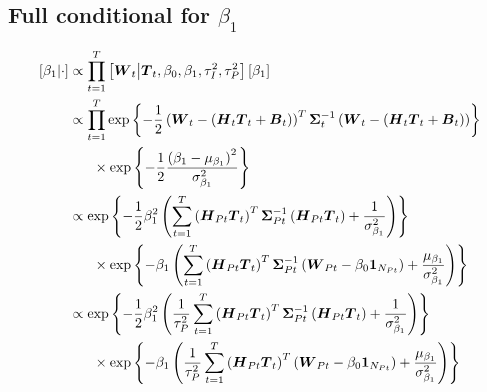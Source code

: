 \documentclass{article}\usepackage[]{graphicx}\usepackage[]{color}
\def\bm#1{\mbox{\boldmath $#1$}}
\begin{document}
\subsection{Full conditional for $\beta_1$}
%
\begin{align*}
%
\left[ \beta_1 \middle| \cdot \right] & \propto \prod_{t = 1}^T \left[ \bm{W}_t \middle| \bm{T}_t, \beta_0, \beta_1, \tau^2_I, \tau^2_P \right] \left[ \beta_1 \right]\\
%
& \propto \prod_{t = 1}^T \exp{ \left\{ - \frac{1} {2} \left( \bm{W}_t - \left( \bm{H}_t \bm{T}_t + \bm{B}_t \right) \right)^T \bm{\Sigma}_t^{ - 1} \left( \bm{W}_t - \left( \bm{H}_t \bm{T}_t + \bm{B}_t \right) \right) \right\} }\\
& \hspace{6mm} \times \exp{ \left\{ - \frac{1} {2} \frac{\left( \beta_1 - \mu_{\beta_1} \right)^2} {\sigma^2_{\beta_1}} \right\} }\\
%
& \propto \exp{ \left\{ - \frac{1} {2} \beta_1^2 \left( \sum_{t = 1}^T \left( \bm{H}_{Pt} \bm{T}_t \right)^T \bm{\Sigma}_{Pt}^{ - 1} \left( \bm{H}_{Pt} \bm{T}_t \right) + \frac{1} {\sigma^2_{\beta_1}} \right) \right\} }\\
& \hspace{6mm} \times \exp{ \left\{ - \beta_1 \left( \sum_{t = 1}^T \left( \bm{H}_{Pt} \bm{T}_t \right)^T \bm{\Sigma}_{Pt}^{ - 1} \left( \bm{W}_{Pt} - \beta_0 \bm{1}_{N_{Pt}} \right) + \frac{\mu_{\beta_1}} {\sigma^2_{\beta_1}} \right) \right\} }\\
%
& \propto \exp{ \left\{ - \frac{1} {2} \beta_1^2 \left( \frac{1} {\tau^2_P} \sum_{t = 1}^T \left( \bm{H}_{Pt} \bm{T}_t \right)^T \bm{\Sigma}_{Pt}^{ - 1} \left( \bm{H}_{Pt} \bm{T}_t \right) + \frac{1} {\sigma^2_{\beta_1}} \right) \right\} }\\
& \hspace{6mm} \times \exp{ \left\{ - \beta_1 \left( \frac{1} {\tau^2_P} \sum_{t = 1}^T \left( \bm{H}_{Pt} \bm{T}_t \right)^T \left( \bm{W}_{Pt} - \beta_0 \bm{1}_{N_{Pt}} \right) + \frac{\mu_{\beta_1}} {\sigma^2_{\beta_1}} \right) \right\} }\\
%
\end{align*}
%
\end{document}
